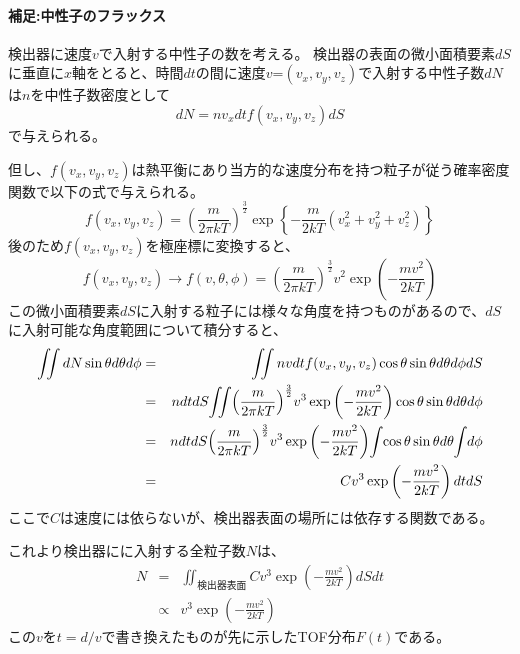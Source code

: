 \paragraph{補足:中性子のフラックス} 
検出器に速度$v$で入射する中性子の数を考える。
検出器の表面の微小面積要素$dS$に垂直に$x$軸をとると、時間$dt$の間に速度{\bf $v$}=$(v_x,v_y,v_z)$で入射する中性子数$dN$は$n$を中性子数密度として
\begin{equation}
dN=nv_xdtf(v_x,v_y,v_z)dS
\end{equation}
で与えられる。

但し、$f(v_x,v_y,v_z)$は熱平衡にあり当方的な速度分布を持つ粒子が従う確率密度関数で以下の式で与えられる。
\begin{equation}
f(v_x,v_y,v_z)={\left(\frac{m}{2\pi kT}\right)}^{\frac{3}{2}}\exp\left\{-\frac{m}{2kT}(v^2_x+v^2_y+v^2_z)\right\} 
\end{equation}
後のため$f(v_x,v_y,v_z)$を極座標に変換すると、
\begin{equation}
f(v_x,v_y,v_z) \rightarrow f(v,\theta,\phi)={\left(\frac{m}{2\pi kT}\right)}^{\frac{3}{2}}v^2\exp\left(-\frac{mv^2}{2kT}\right)
\end{equation}
この微小面積要素$dS$に入射する粒子には様々な角度を持つものがあるので、$dS$に入射可能な角度範囲について積分すると、
\begin{eqnarray*}
 \iint dN\sin\theta d\theta d\phi &=&\iint nvdtf(v_x,v_y,v_z)\cos\theta \sin\theta d\theta d\phi dS \\ 
&=&ndtdS \hspace{-2pt}\iint \hspace{-2pt}{\left(\frac{m}{2\pi kT}\right)}^{\frac{3}{2}}v^3\exp\left(-\frac{mv^2}{2kT}\right)\cos\theta \sin\theta d\theta d\phi  \\
&=&ndtdS{\left(\frac{m}{2\pi kT}\right)}^{\frac{3}{2}} v^3\exp\left(-\frac{mv^2}{2kT}\right) \hspace{-2pt}\int \hspace{-2pt}\cos\theta\sin\theta d\theta \hspace{-2pt}\int \hspace{-2pt} d\phi \\
&=&Cv^3\exp\left(-\frac{mv^2}{2kT}\right)dtdS
\end{eqnarray*}
ここで$C$は速度には依らないが、検出器表面の場所には依存する関数である。

これより検出器にに入射する全粒子数$N$は、
\begin{eqnarray*}
N &=&
\iint_{検出器表面}Cv^3\exp\left(-\frac{mv^2}{2kT}\right)dSdt \\
&\propto& v^3\exp\left(-\frac{mv^2}{2kT}\right)
\end{eqnarray*}
この$v$を$t=d/v$で書き換えたものが先に示したTOF分布$F(t)$である。
\newpage
